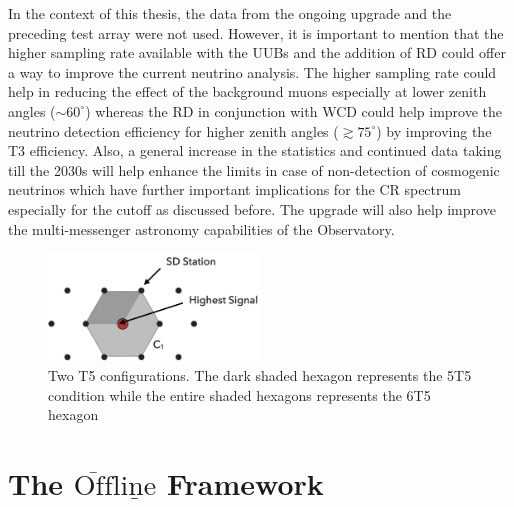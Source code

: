 In the context of this thesis, the data from the ongoing upgrade and the preceding test array were not used. However, it is important to mention that the higher sampling rate available with the UUBs and the addition of RD could offer a way to improve the current neutrino analysis. The higher sampling rate could help in reducing the effect of the background muons especially at lower zenith angles ($\sim 60^{\circ}$) whereas the RD in conjunction with WCD could help improve the neutrino detection efficiency for higher zenith angles ($\gtrsim 75^{\circ}$) by improving the T3 efficiency. Also, a general increase in the statistics and continued data taking till the 2030s will help enhance the limits in case of non-detection of cosmogenic neutrinos which have further important implications for the CR spectrum especially for the cutoff as discussed before. The upgrade will also help improve the multi-messenger astronomy capabilities of the Observatory. 

\begin{figure}[t!]
  \centering
  \includegraphics[width=0.5\textwidth]{thesis_figures/Setup/T5_modes.png}
  \caption{Two T5 configurations. The dark shaded hexagon represents the 5T5 condition while the entire shaded hexagons represents the 6T5 hexagon}
  \label{fig:T5_config}
\end{figure}

\section{The \texorpdfstring{$\overline{\text{Off}} \underline{\text{line}}$}{} Framework}
\label{sec:Offline}

